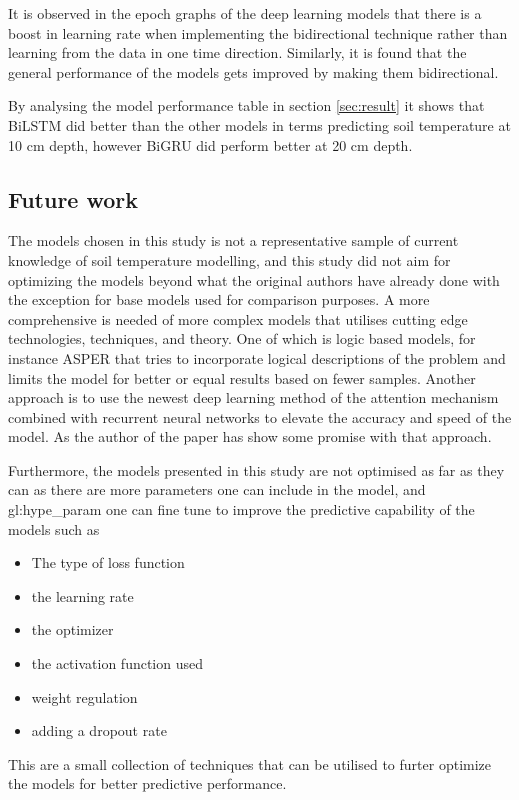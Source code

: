 It is observed in the epoch graphs of the deep learning models that there is a boost in learning rate when implementing the bidirectional technique rather than learning  from the data in one time direction. Similarly, it is found that the general performance of the models gets improved by making them bidirectional.

By analysing the model performance table in section \ref{sec:result} it shows that BiLSTM did better than the other models in terms predicting soil temperature at 10 cm depth, however BiGRU did perform better at 20 cm depth.

\subsection{Future work}

The models chosen in this study is not a representative sample of current knowledge of soil temperature modelling, and this study did not aim for optimizing the models beyond what the original authors have already done with the exception for base models used for comparison purposes. A more comprehensive is needed of more complex models that utilises cutting edge technologies, techniques, and theory. One of which is logic based models, for instance ASPER\cite{le_asper_2023} that tries to incorporate logical descriptions of the problem and limits the model for better or equal results based on fewer samples\cite{machot_bridging_2023}. Another approach is to use the newest deep learning method of the attention mechanism\cite{vaswani_attention_2017} combined with recurrent neural networks to elevate the accuracy and speed of the model. As the author of the paper \cite{li_attention-aware_2022} has show some promise with that approach.

Furthermore, the models presented in this study are not optimised as far as they can as there are more parameters one can include in the model, and \gls{gl:hype_param} one can fine tune to improve the predictive capability of the models such as
\begin{itemize}
	\item The type of loss function
	\item the learning rate
	\item the optimizer
	\item the activation function used
	\item weight regulation
	\item adding a dropout rate
\end{itemize}
This are a small collection of techniques that can be utilised to furter optimize the models for better predictive performance. 


